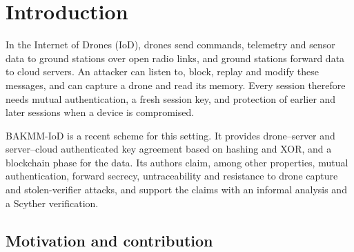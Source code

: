 \section{Introduction}\label{sec:intro}

In the Internet of Drones (IoD), drones send commands, telemetry and sensor data to ground stations over open radio links,
and ground stations forward data to cloud servers. An attacker can listen to, block, replay and modify these messages, and can
capture a drone and read its memory. Every session therefore needs mutual authentication, a fresh session key, and protection
of earlier and later sessions when a device is compromised.

BAKMM-IoD \citep{wazid2025} is a recent scheme for this setting. It provides drone--server and server--cloud authenticated key
agreement based on hashing and XOR, and a blockchain phase for the data. Its authors claim, among other properties, mutual
authentication, forward secrecy, untraceability and resistance to drone capture and stolen-verifier attacks, and support the
claims with an informal analysis and a Scyther verification.

\subsection{Motivation and contribution}

